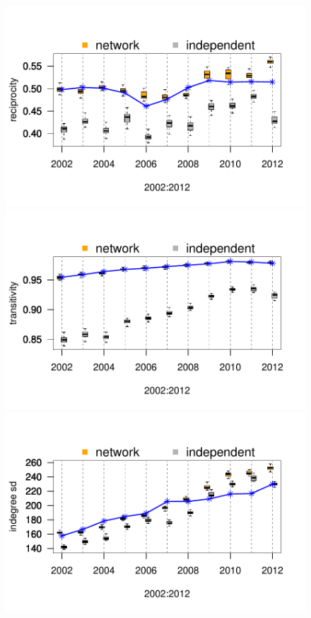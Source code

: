 \documentclass[reqno,onecolumn,letterpaper,12pt]{article}
\begin{document}
\begin{figure}[]
\centering
\includegraphics[scale=.75, trim = 0cm 1.5cm .1cm 0cm, clip=true  ]{figures/recip_fit.pdf}  \\
\includegraphics[scale=.75,  trim = 0cm 1.5cm .1cm 2.4cm, clip=true]{figures/trans_fit.pdf}  \\
\includegraphics[scale=.75, trim = 0cm 1.5cm .1cm 2.4cm, clip=true]{figures/idsd_fit.pdf}  \\

\end{figure}
\end{document}
